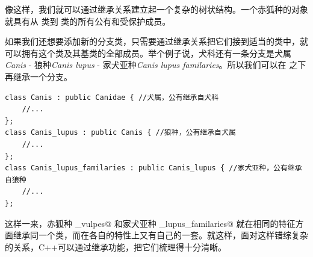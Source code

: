像这样，我们就可以通过继承关系建立起一个复杂的树状结构。一个赤狐种的对象就具有从 \lstinline@Eukarya@ 类到 \lstinline@Vulpes@ 类的所有公有和受保护成员。\par
如果我们还想要添加新的分支类，只需要通过继承关系把它们接到适当的类中，就可以拥有这个类及其基类的全部成员。举个例子说，犬科还有一条分支是犬属\textit{Canis} - 狼种\textit{Canis lupus} - 家犬亚种\textit{Canis lupus familaries}。所以我们可以在 \lstinline@Canidae@ 之下再继承一个分支。
\begin{lstlisting}
class Canis : public Canidae { //犬属，公有继承自犬科
    //...
};
class Canis_lupus : public Canis { //狼种，公有继承自犬属
    //...
};
class Canis_lupus_familaries : public Canis_lupus { //家犬亚种，公有继承自狼种
    //...
};
\end{lstlisting}\par
这样一来，赤狐种 \lstinline@Vulpes_vulpes@ 和家犬亚种 \lstinline@Canis_lupus_familaries@ 就在相同的特征方面继承同一个类，而在各自的特性上又有自己的一套。就这样，面对这样错综复杂的关系，C++可以通过继承功能，把它们梳理得十分清晰。\par
